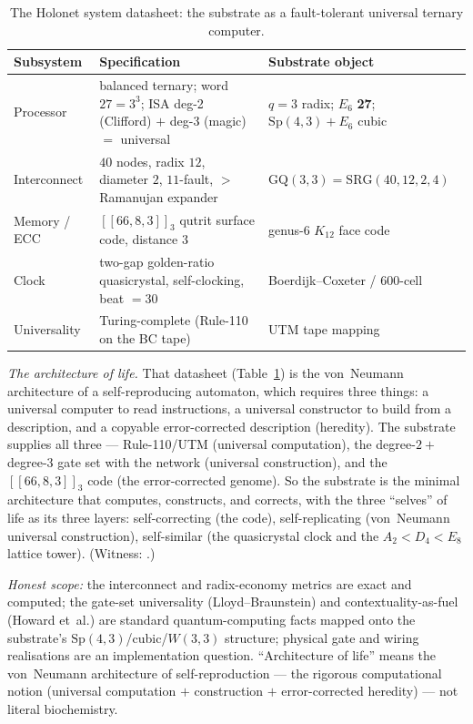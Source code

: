 \documentclass[11pt]{article}
\begin{document}
\begin{table}[ht]\centering\small
\caption{The Holonet system datasheet: the substrate as a fault-tolerant universal ternary computer.}
\label{tab:datasheet}
\begin{tabular}{l l l}
\toprule
Subsystem & Specification & Substrate object\\ \midrule
Processor & balanced ternary; word $27{=}3^3$; ISA deg-2 (Clifford) $+$ deg-3 (magic) $=$ universal
 & $q{=}3$ radix; $E_6$ \textbf{27}; $\mathrm{Sp}(4,3)+E_6$ cubic\\
Interconnect & $40$ nodes, radix $12$, diameter $2$, $11$-fault, $>$Ramanujan expander
 & $\mathrm{GQ}(3,3){=}\mathrm{SRG}(40,12,2,4)$\\
Memory / ECC & $[\![66,8,3]\!]_3$ qutrit surface code, distance $3$
 & genus-$6$ $K_{12}$ face code\\
Clock & two-gap golden-ratio quasicrystal, self-clocking, beat $=30$
 & Boerdijk--Coxeter / $600$-cell\\
Universality & Turing-complete (Rule-110 on the BC tape)
 & UTM tape mapping\\
\bottomrule
\end{tabular}
\end{table}

\emph{The architecture of life.} That datasheet (Table~\ref{tab:datasheet}) is the von~Neumann
architecture of a self-reproducing automaton, which requires three things: a universal computer to
read instructions, a universal constructor to build from a description, and a copyable
error-corrected description (heredity). The substrate supplies all three --- Rule-110/UTM (universal
computation), the degree-$2+$degree-$3$ gate set with the network (universal construction), and the
$[\![66,8,3]\!]_3$ code (the error-corrected genome). So the substrate is the minimal
architecture that computes, constructs, and corrects, with the three ``selves'' of life as its three
layers: self-correcting (the code), self-replicating (von~Neumann universal construction),
self-similar (the quasicrystal clock and the $A_2{<}D_4{<}E_8$ lattice tower). (Witness:
.)

\emph{Honest scope:} the interconnect and radix-economy metrics are exact and computed; the gate-set
universality (Lloyd--Braunstein) and contextuality-as-fuel (Howard et~al.) are standard
quantum-computing facts mapped onto the substrate's $\mathrm{Sp}(4,3)$/cubic/$W(3,3)$ structure;
physical gate and wiring realisations are an implementation question. ``Architecture of life'' means
the von~Neumann architecture of self-reproduction --- the rigorous computational notion (universal
computation $+$ construction $+$ error-corrected heredity) --- not literal biochemistry.
\end{document}
